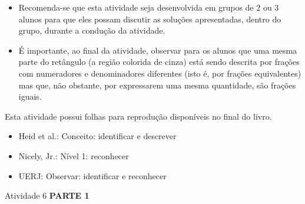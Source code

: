 \begin{multicols}{2}
  
 
\begin{itemize} %
    \item       Recomenda-se que esta atividade seja desenvolvida em grupos de   
    $2$       ou       $3$       alunos para que eles possam discutir as 
soluções apresentadas, dentro do grupo, durante a condução da atividade.
    \item       É importante, ao final da atividade, observar para os alunos que 
uma mesma parte do retângulo (a região colorida de cinza) está sendo descrita 
por frações com numeradores e denominadores diferentes (isto é, por frações 
equivalentes) mas que, não obstante, por expressarem uma mesma quantidade, são 
frações iguais. 
\end{itemize} %
  
  
  Esta atividade possui     folhas para reprodução disponíveis no final do 
livro.
  
   \vspace{.1cm}
  
 \vspace{.1cm}
  
\begin{itemize} %
    \item       Heid et al.: Conceito: identificar e descrever
    \item       Nicely, Jr.: Nível 1: reconhecer
    \item       UERJ: Observar: identificar e reconhecer
\end{itemize} %


 \vspace*{\fill}
\columnbreak

\begin{resposta*}{Atividade 6}
  {\bf PARTE 1}  



\end{resposta*}
\end{multicols}
